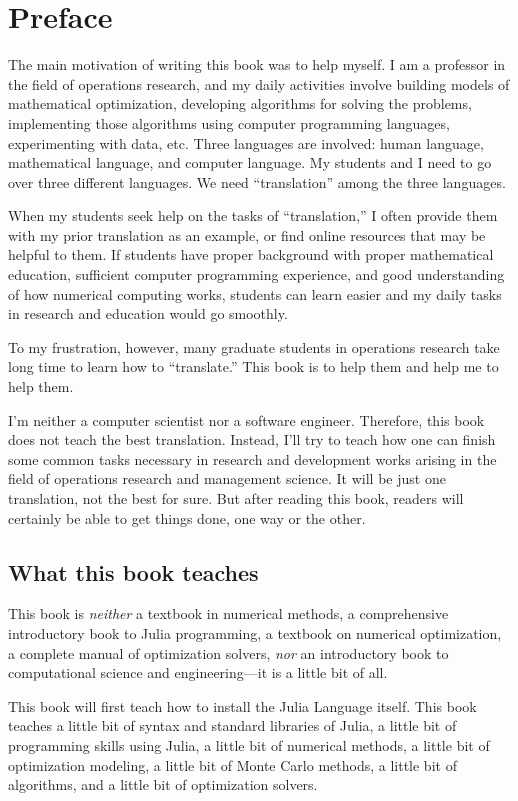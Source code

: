 \chapter*{Preface}

The main motivation of writing this book was to help myself. I am a professor in the field of operations research, and my daily activities involve building models of mathematical optimization, developing algorithms for solving the problems, implementing those algorithms using computer programming languages, experimenting with data, etc. Three languages are involved: human language, mathematical language, and computer language. My students and I need to go over three different languages. We need ``translation'' among the three languages.

When my students seek help on the tasks of ``translation,'' I often provide them with my prior translation as an example, or find online resources that may be helpful to them. If students have proper background with proper mathematical education, sufficient computer programming experience, and good understanding of how numerical computing works, students can learn easier and my daily tasks in research and education would go smoothly.

To my frustration, however, many graduate students in operations research take long time to learn how to ``translate.'' This book is to help them and help me to help them. 

I'm neither a computer scientist nor a software engineer. Therefore, this book does not teach the best translation. Instead, I'll try to teach how one can finish some common tasks necessary in research and development works arising in the field of operations research and management science. It will be just one translation, not the best for sure. But after reading this book, readers will certainly be able to get things done, one way or the other.


\section*{What this book teaches}

This book is \emph{neither} a textbook in numerical methods, a comprehensive introductory book to Julia programming, a textbook on numerical optimization, a complete manual of optimization solvers, \emph{nor} an introductory book to computational science and engineering---it is a little bit of all.

This book will first teach how to install the Julia Language itself. This book teaches a little bit of syntax and standard libraries of Julia, a little bit of programming skills using Julia, a little bit of numerical methods, a little bit of optimization modeling, a little bit of Monte Carlo methods, a little bit of algorithms, and a little bit of optimization solvers. 

